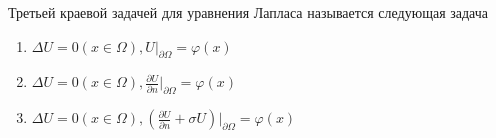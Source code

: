 Третьей краевой задачей для уравнения Лапласа называется следующая задача

\begin{enumerate}[label=\arabic*)]
    \item \(\Delta U =0 ( x \in \Omega ), U\vert _{\partial \Omega }=\varphi (x)\)
    \item \(\Delta U =0 ( x \in \Omega ), \frac{\partial U}{\partial n}\vert _{\partial \Omega }=\varphi (x)\)
    \item \(\Delta U =0 ( x\in \Omega ), (\frac{\partial U}{\partial n}+\sigma U)\vert _{\partial \Omega }=\varphi (x)\)
\end{enumerate}

